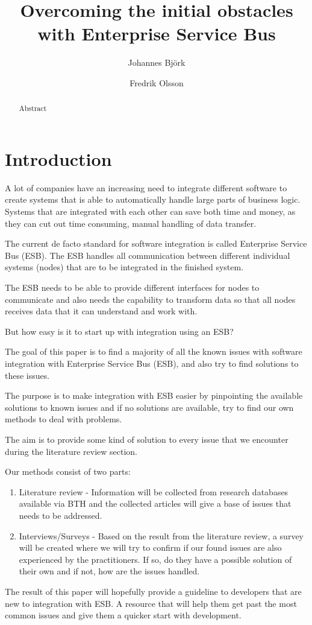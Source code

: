 \documentclass{llncs}
\title{Overcoming the initial obstacles with Enterprise Service Bus}
\author{Johannes Björk \inst{1} \and Fredrik Olsson \inst{1}}
\institute{
	Blekinge Institute of Technology \\
	\email{johannes@johannesbjork.se}, \email{spooky.bender@gmail.com}
}
\begin{document}
\maketitle

\begin{abstract}
Abstract
\end{abstract}

\section{Introduction}
A lot of companies have an increasing need to integrate different software to create systems that is able to automatically handle large parts of business logic. Systems that are integrated with each other can save both time and money, as they can cut out time consuming, manual handling of data transfer.

The current de facto standard for software integration is called Enterprise Service Bus (ESB). The ESB handles all communication between different individual systems (nodes) that are to be integrated in the finished system.

The ESB needs to be able to provide different interfaces for nodes to communicate and also needs the capability to transform data so that all nodes receives data that it can understand and work with.

But how easy is it to start up with integration using an ESB?

The goal of this paper is to find a majority of all the known issues with software integration with Enterprise Service Bus (ESB), and also try to find solutions to these issues.

The purpose is to make integration with ESB easier by pinpointing the available solutions to known issues and if no solutions are available, try to find our own methods to deal with problems.

The aim is to provide some kind of solution to every issue that we encounter during the literature review section.

Our methods consist of two parts:
\begin{enumerate}
 \item Literature review - Information will be collected from research databases available via BTH and the collected articles will give a base of issues that needs to be addressed.
 \item Interviews/Surveys - Based on the result from the literature review, a survey will be created where we will try to confirm if our found issues are also experienced by the practitioners. If so, do they have a possible solution of their own and if not, how are the issues handled.
\end{enumerate}
The result of this paper will hopefully provide a guideline to developers that are new to integration with ESB. A resource that will help them get past the most common issues and give them a quicker start with development.
\end{document}
